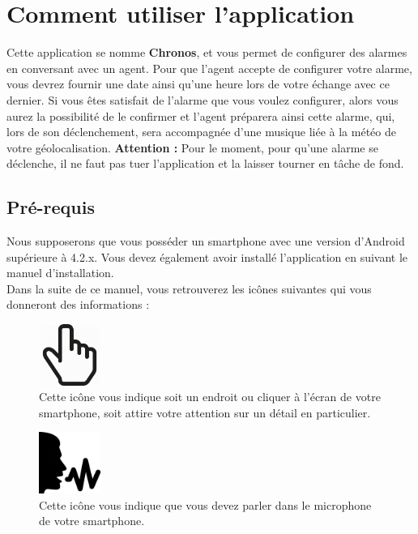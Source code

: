 \chapter{Comment utiliser l'application}

Cette application se nomme \textbf{Chronos}, et vous permet de configurer des alarmes en conversant avec un agent. Pour que l'agent accepte de configurer votre alarme,
vous devrez fournir une date ainsi qu'une heure lors de votre échange avec ce dernier. Si vous êtes satisfait de l'alarme que vous voulez configurer, alors vous
aurez la possibilité de le confirmer et l'agent préparera ainsi cette alarme, qui, lors de son déclenchement, sera accompagnée d'une musique liée à la météo de votre
géolocalisation. \textbf{Attention :} Pour le moment, pour qu'une alarme se déclenche, il ne faut pas tuer l'application et la laisser tourner en tâche de fond.

\section{Pré-requis}
Nous supposerons que vous posséder un smartphone avec une version d'Android supérieure à 4.2.x. Vous devez également avoir installé l'application
en suivant le manuel d'installation.\\

Dans la suite de ce manuel, vous retrouverez les icônes suivantes qui vous donneront des informations :

\begin{figure}[H]
  \centering
  \includegraphics[width=2cm]{images/hand.png}
  \caption{Cette icône vous indique soit un endroit ou cliquer à l'écran de votre smartphone, soit attire votre attention sur un détail en particulier.}
\end{figure}

\begin{figure}[H]
  \centering
  \includegraphics[width=2cm]{images/voice.png}
  \caption{Cette icône vous indique que vous devez parler dans le microphone de votre smartphone.}
\end{figure}

